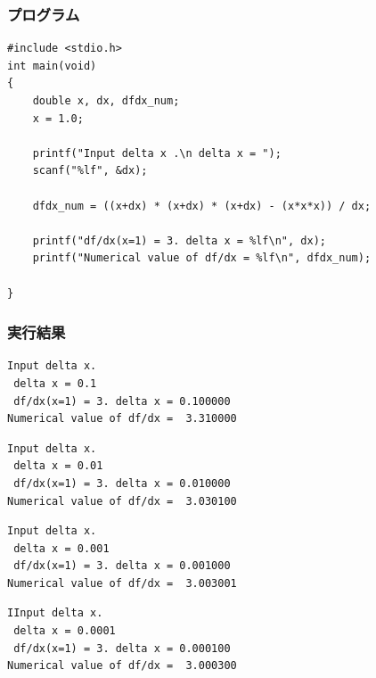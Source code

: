 \documentclass{jarticle}
\begin{document}
\subsubsection{プログラム\\}
\begin{breakbox}
\begin{verbatim}
#include <stdio.h>
int main(void)
{
    double x, dx, dfdx_num;
    x = 1.0;
    
    printf("Input delta x .\n delta x = ");
    scanf("%lf", &dx);
    
    dfdx_num = ((x+dx) * (x+dx) * (x+dx) - (x*x*x)) / dx;
    
    printf("df/dx(x=1) = 3. delta x = %lf\n", dx);
    printf("Numerical value of df/dx = %lf\n", dfdx_num);

}
\end{verbatim}
\end{breakbox}

\subsubsection{実行結果\\}
\begin{breakbox}
\begin{verbatim}
Input delta x. 
 delta x = 0.1 
 df/dx(x=1) = 3. delta x = 0.100000 
Numerical value of df/dx =  3.310000 
\end{verbatim}
\end{breakbox}

\begin{breakbox}
\begin{verbatim}
Input delta x. 
 delta x = 0.01
 df/dx(x=1) = 3. delta x = 0.010000 
Numerical value of df/dx =  3.030100 
\end{verbatim}
\end{breakbox}

\begin{breakbox}
\begin{verbatim}
Input delta x. 
 delta x = 0.001
 df/dx(x=1) = 3. delta x = 0.001000 
Numerical value of df/dx =  3.003001 
\end{verbatim}
\end{breakbox}

\begin{breakbox}
\begin{verbatim}
IInput delta x. 
 delta x = 0.0001
 df/dx(x=1) = 3. delta x = 0.000100 
Numerical value of df/dx =  3.000300 
\end{verbatim}
\end{breakbox}
\end{document}
